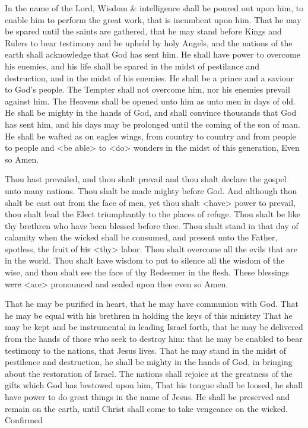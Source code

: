 					In the name of the Lord, Wisdom \& intelligence shall be poured out upon him, to enable him to perform the great work, that is incumbent upon him. That he may be spared until the saints are gathered, that he may stand before Kings and Rulers to bear testimony and be upheld by holy Angels, and the nations of the earth shall acknowledge that God has sent him. He shall have power to overcome his enemies, and his life shall be spared in the midst of pestilance and destruction, and in the midst of his enemies. He shall be a prince and a saviour to God's people. The Tempter shall not overcome him, nor his enemies prevail against him. The Heavens shall be opened unto him as unto men in days of old. He shall be mighty in the hands of God, and shall convince thousands that God has sent him, and his days may be prolonged until the coming of the son of man. He shall be wafted as on eagles wings, from country to country and from people to people and <be able> to <do> wonders in the midst of this generation, Even so Amen.
					

					Thou hast prevailed, and thou shalt prevail and thou shalt declare the gospel unto many nations. Thou shalt be made mighty before God. And although thou shalt be cast out from the face of men, yet thou shalt <have> power to prevail, thou shalt lead the Elect triumphantly to the places of refuge. Thou shalt be like thy brethren who have been blessed before thee. Thou shalt stand in that day of calamity when the wicked shall be consumed, and present unto the Father, spotless, the fruit of \sout{his} <thy> labor. Thou shalt overcome all the evils that are in the world. Thou shalt have wisdom to put to silence all the wisdom of the wise, and thou shalt see the face of thy Redeemer in the flesh. These blessings \sout{were} <are> pronounced and sealed upon thee even so Amen.
					

					That he may be purified in heart, that he may have communion with God. That he may be equal with his brethren in holding the keys of this ministry That he may be kept and be instrumental in leading Israel forth, that he may be delivered from the hands of those who seek to destroy him: that he may be enabled to bear testimony to the nations, that Jesus lives. That he may stand in the midst of pestilence and destruction, he shall be mighty in the hands of God, in bringing about the restoration of Israel. The nations shall rejoice at the greatness of the gifts which God has bestowed upon him, That his tongue shall be loosed, he shall have power to do great things in the name of Jesus. He shall be preserved and remain on the earth, until Christ shall come to take vengeance on the wicked. Confirmed
					
